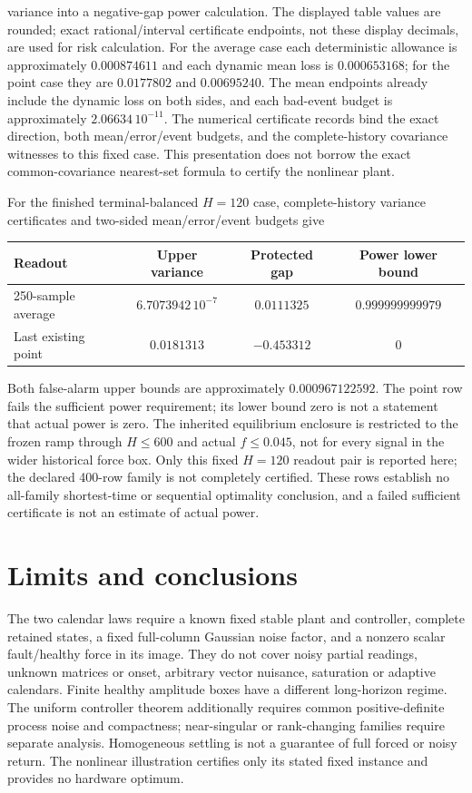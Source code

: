 \documentclass[journal]{IEEEtran}
\begin{document}
variance into a negative-gap power calculation.
The displayed table values are rounded; exact rational/interval certificate
endpoints, not these display decimals, are used for risk calculation.
For the average case each deterministic allowance is approximately
$0.000874611$ and each dynamic mean loss is $0.000653168$;
for the point case they are $0.0177802$ and $0.00695240$.
The mean endpoints already include the dynamic loss on both sides, and each
bad-event budget is approximately $2.06634\,10^{-11}$.
The numerical certificate records bind the exact direction, both mean/error/event
budgets, and the complete-history covariance witnesses to this fixed case. This presentation does not borrow the
exact common-covariance nearest-set formula to certify the nonlinear plant.

For the finished terminal-balanced $H=120$ case, complete-history variance
certificates and two-sided mean/error/event budgets give
\begin{center}
\begin{tabular}{lccc}
\toprule
Readout & Upper variance & Protected gap & Power lower bound\\
\midrule
250-sample average & $6.7073942\,10^{-7}$ & $0.0111325$ & $0.999999999979$\\
Last existing point & $0.0181313$ & $-0.453312$ & $0$\\
\bottomrule
\end{tabular}
\end{center}
Both false-alarm upper bounds are approximately $0.000967122592$.
The point row fails the sufficient power requirement; its lower bound zero is
not a statement that actual power is zero. The inherited equilibrium enclosure
is restricted to the frozen ramp through $H\le600$
and actual $f\le0.045$, not for every signal in the wider historical force box.
Only this fixed $H=120$ readout pair is reported here; the declared 400-row
family is not completely certified. These rows establish no all-family
shortest-time or sequential optimality conclusion, and a failed sufficient
certificate is not an estimate of actual power.

\section{Limits and conclusions}\label{sf:conclusion}
The two calendar laws require a known fixed stable plant and controller,
complete retained states, a fixed full-column Gaussian noise factor, and a
nonzero scalar fault/healthy force in its image. They do not cover noisy
partial readings, unknown matrices or onset, arbitrary vector nuisance,
saturation or adaptive calendars. Finite healthy amplitude boxes have a
different long-horizon regime. The uniform controller theorem additionally
requires common positive-definite process noise and compactness; near-singular
or rank-changing families require separate analysis. Homogeneous settling is
not a guarantee of full forced or noisy return. The nonlinear illustration
certifies only its stated fixed instance and provides no hardware optimum.
\end{document}
